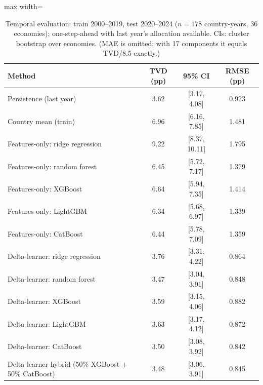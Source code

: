 \begin{table}
\caption{Temporal evaluation: train 2000--2019, test 2020--2024 ($n=178$ country-years, 36 economies); one-step-ahead with last year's allocation available. CIs: cluster bootstrap over economies. (MAE is omitted: with 17 components it equals TVD/8.5 exactly.)}\label{tab:A1}
\centering\small
\renewcommand{\arraystretch}{1.1}
\begin{adjustbox}{max width=\linewidth}
\begin{tabular}{lccc}
\toprule
Method & TVD (pp) & 95\% CI & RMSE (pp) \\
\midrule
Persistence (last year) & 3.62 & [3.17, 4.08] & 0.923 \\
Country mean (train) & 6.96 & [6.16, 7.85] & 1.481 \\
Features-only: ridge regression & 9.22 & [8.37, 10.11] & 1.795 \\
Features-only: random forest & 6.45 & [5.72, 7.17] & 1.379 \\
Features-only: XGBoost & 6.64 & [5.94, 7.35] & 1.414 \\
Features-only: LightGBM & 6.34 & [5.68, 6.97] & 1.339 \\
Features-only: CatBoost & 6.44 & [5.78, 7.09] & 1.359 \\
Delta-learner: ridge regression & 3.76 & [3.31, 4.22] & 0.864 \\
Delta-learner: random forest & 3.47 & [3.04, 3.91] & 0.848 \\
Delta-learner: XGBoost & 3.59 & [3.15, 4.06] & 0.882 \\
Delta-learner: LightGBM & 3.63 & [3.17, 4.12] & 0.872 \\
Delta-learner: CatBoost & 3.50 & [3.08, 3.92] & 0.842 \\
Delta-learner hybrid (50\% XGBoost + 50\% CatBoost) & 3.48 & [3.06, 3.91] & 0.845 \\
\bottomrule
\end{tabular}\end{adjustbox}
\end{table}
